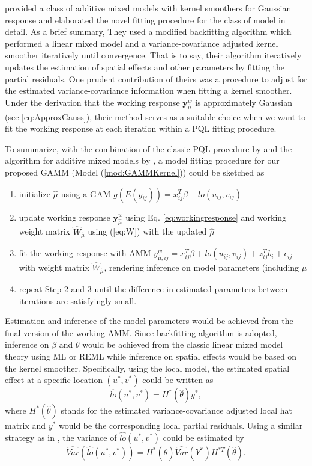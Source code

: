 	\cite{Tang2020Additive} provided a class of additive mixed models with kernel smoothers for Gaussian response and elaborated the novel fitting procedure for the class of model in detail. As a brief summary, They used a modified backfitting algorithm which performed a linear mixed model and a variance-covariance adjusted kernel smoother iteratively until convergence. That is to say, their algorithm iteratively updates the estimation of spatial effects and other parameters by fitting the partial residuals. One prudent contribution of theirs was a procedure to adjust for the estimated variance-covariance information when fitting a kernel smoother. Under the derivation that the working response $\mathbf{y}_{\hat{\mu}}^w$ is approximately Gaussian (see \ref{eq:ApproxGauss}), their method serves as a suitable choice when we want to fit the working response at each iteration within a PQL fitting procedure. 
	
	To summarize, with the combination of the classic PQL procedure by \cite{wolfinger1993generalized} and the algorithm for additive mixed models by \cite{Tang2020Additive}, a model fitting procedure for our proposed GAMM (Model (\ref{mod:GAMMKernel})) could be sketched as 
	
	\begin{enumerate}
		\item initialize $\hat{\mu}$ using a GAM $g(E(y_{ij}))=x_{ij}^T\beta+lo(u_{ij},v_{ij})$
		\item update working response $\mathbf{y}_{\hat{\mu}}^w$ using Eq. \ref{eq:workingresponse} and working weight matrix $\hat{W}_{\hat{\mu}}$ using (\ref{eq:W}) with the updated $\hat{\mu}$
		\item fit the working response with AMM ${y}_{\hat{\mu},ij}^w=x_{ij}^T\beta + lo(u_{ij}, v_{ij}) + z_{ij}^Tb_i+\epsilon_{ij}$ with weight matrix $\hat{W}_{\hat{\mu}}$, rendering inference on model parameters (including $\hat{\mu}$
		\item repeat Step 2 and 3 until the difference in estimated parameters between iterations are satisfyingly small. 
	\end{enumerate}
	
	Estimation and inference of the model parameters would be achieved from the final version of the working AMM. Since backfitting algorithm is adopted, inference on $\beta$ and $\theta$ would be achieved from the classic linear mixed model theory using ML or REML while inference on spatial effects would be based on the kernel smoother. Specifically, using the local model, the estimated spatial effect at a specific location $(u^*,v^*)$ could be written as 
	\begin{equation} \label{eq:haty}
	\hat{lo}(u^*,v^*)=H^*(\hat{\theta})y^*,
	\end{equation}
	where $H^*(\hat{\theta})$ stands for the estimated variance-covariance adjusted local hat matrix and $y^*$ would be the corresponding local partial residuals. Using a similar strategy as in \citet{Tang2020Additive}, the variance of $\hat{lo}(u^*,v^*)$ could be estimated by
	\begin{equation} \label{eq:VarLO}
	\widehat{Var}(\hat{lo}(u^*,v^*))=H^*(\hat{\theta})\widehat{Var}(Y^*)H^{*T}(\hat{\theta}).
	\end{equation}
	
